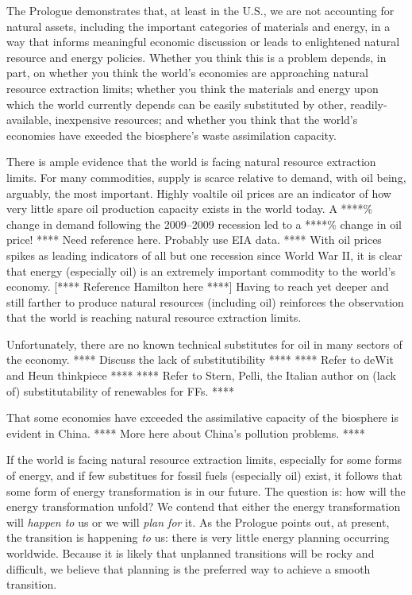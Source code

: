 The Prologue demonstrates that, at least in the U.S., 
we are not accounting for natural assets, 
including the important categories of materials and energy,
in a way that informs meaningful economic discussion or
leads to enlightened natural resource and energy policies.
Whether you think this is a problem depends, in part, on 
whether you think the world's economies are approaching 
	natural resource extraction limits;
whether you think the materials and energy upon which the world currently depends
	can be easily substituted by other, readily-available, inexpensive resources; and
whether you think that the world's economies have exeeded 
	the biosphere's waste assimilation capacity.

There is ample evidence that the world is facing
natural resource extraction limits.
For many commodities, supply is scarce relative to demand, 
with oil being, arguably, the most important. 
Highly voaltile oil prices are an indicator of how very little 
spare oil production capacity exists in the world today. 
A ****\% change in demand following the 2009--2009 recession
led to a ****\% change in oil price! 
**** Need reference here. Probably use EIA data. ****
With oil prices spikes as leading indicators of all but one recession 
since World War II, it is clear that energy (especially oil)
is an extremely important commodity to the world's economy.
[**** Reference Hamilton here ****]
Having to reach yet deeper and still farther 
to produce natural resources (including oil) 
reinforces the observation that 
the world is reaching natural resource extraction limits.

Unfortunately, there are no known technical substitutes for oil 
in many sectors of the economy.
**** Discuss the lack of substitutibility **** 
**** Refer to deWit and Heun thinkpiece ****
**** Refer to Stern, Pelli, the Italian author on (lack of) 
substitutability of renewables for FFs. ****

That some economies have exceeded the assimilative capacity of the biosphere
is evident in China. **** More here about China's pollution problems. ****

If the world is facing natural resource extraction limits,
especially for some forms of energy, 
and if few substitues for fossil fuels (especially oil) exist,
it follows that some form of energy transformation is in our future.
The question is: how will the energy transformation unfold?
We contend that either the energy transformation 
will \emph{happen to} us or we will \emph{plan for} it.
As the Prologue points out, at present, the transition is happening \emph{to} us:
there is very little energy planning occurring worldwide.
Because it is likely that unplanned transitions will be rocky and difficult,
we believe that planning is the preferred way to achieve a smooth transition.


